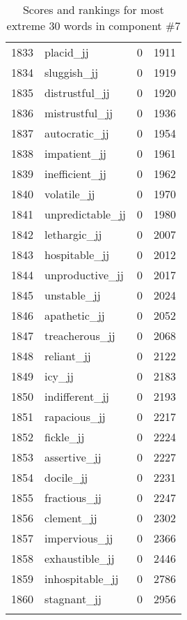 \begin{longtable}[!htbp]{| rlr@{.}l |}
    1833 & placid\_jj & 0 & 1911 \\
    1834 & sluggish\_jj & 0 & 1919 \\
    1835 & distrustful\_jj & 0 & 1920 \\
    1836 & mistrustful\_jj & 0 & 1936 \\
    1837 & autocratic\_jj & 0 & 1954 \\
    1838 & impatient\_jj & 0 & 1961 \\
    1839 & inefficient\_jj & 0 & 1962 \\
    1840 & volatile\_jj & 0 & 1970 \\
    1841 & unpredictable\_jj & 0 & 1980 \\
    1842 & lethargic\_jj & 0 & 2007 \\
    1843 & hospitable\_jj & 0 & 2012 \\
    1844 & unproductive\_jj & 0 & 2017 \\
    1845 & unstable\_jj & 0 & 2024 \\
    1846 & apathetic\_jj & 0 & 2052 \\
    1847 & treacherous\_jj & 0 & 2068 \\
    1848 & reliant\_jj & 0 & 2122 \\
    1849 & icy\_jj & 0 & 2183 \\
    1850 & indifferent\_jj & 0 & 2193 \\
    1851 & rapacious\_jj & 0 & 2217 \\
    1852 & fickle\_jj & 0 & 2224 \\
    1853 & assertive\_jj & 0 & 2227 \\
    1854 & docile\_jj & 0 & 2231 \\
    1855 & fractious\_jj & 0 & 2247 \\
    1856 & clement\_jj & 0 & 2302 \\
    1857 & impervious\_jj & 0 & 2366 \\
    1858 & exhaustible\_jj & 0 & 2446 \\
    1859 & inhospitable\_jj & 0 & 2786 \\
    1860 & stagnant\_jj & 0 & 2956 \\
    \hline
    \caption{Scores and rankings for most extreme 30 words in component \#7} \\
\end{longtable}
